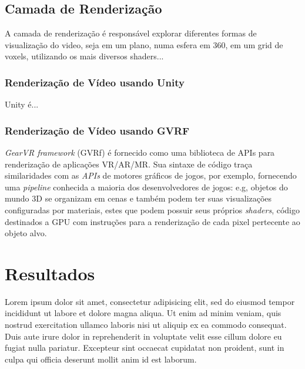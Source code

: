 \documentclass[sigconf]{acmart}
\begin{document}
\subsection{Camada de Renderização} \label{sec-arch-subsec-render-layer}

A camada de renderização é responsável explorar diferentes formas de visualização do video, seja em um plano, numa esfera em 360, em um grid de voxels, utilizando os mais diversos shaders...


\subsubsection{Renderização de Vídeo usando Unity}


Unity é...


\subsubsection{Renderização de Vídeo usando GVRF}

\textit{GearVR framework} (GVRf) é fornecido como uma biblioteca de APIs para renderização de aplicações VR/AR/MR. Sua sintaxe de código traça similaridades com as \textit{APIs} de motores gráficos de jogos, por exemplo, fornecendo uma \textit{pipeline} conhecida a maioria dos desenvolvedores de jogos: e.g, objetos do mundo 3D se organizam em cenas e também podem ter suas visualizações configuradas por materiais, estes que podem possuir seus próprios \textit{shaders}, código destinados a GPU com instruções para a renderização de cada pixel pertecente ao objeto alvo.


\section{Resultados} \label{sec-results}


Lorem ipsum dolor sit amet, consectetur adipisicing elit, sed do eiusmod
tempor incididunt ut labore et dolore magna aliqua. Ut enim ad minim veniam,
quis nostrud exercitation ullamco laboris nisi ut aliquip ex ea commodo
consequat. Duis aute irure dolor in reprehenderit in voluptate velit esse
cillum dolore eu fugiat nulla pariatur. Excepteur sint occaecat cupidatat non
proident, sunt in culpa qui officia deserunt mollit anim id est laborum.
\end{document}
